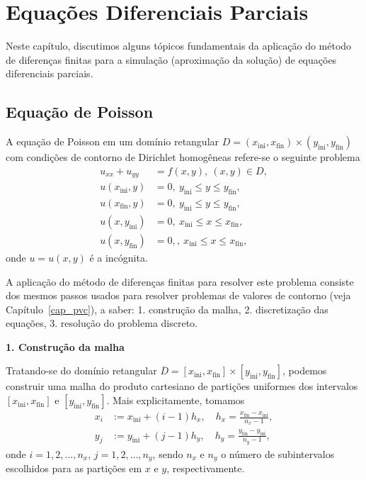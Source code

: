 

\chapter{Equações Diferenciais Parciais}\label{cap_edp}
\thispagestyle{fancy}

Neste capítulo, discutimos alguns tópicos fundamentais da aplicação do método de diferenças finitas para a simulação (aproximação da solução) de equações diferenciais parciais.

\section{Equação de Poisson}\label{cap_edp_sec_Poisson}

A equação de Poisson em um domínio retangular $D = (x_{\text{ini}}, x_{\text{fin}})\times (y_{\text{ini}}, y_{\text{fin}})$ com condições de contorno de Dirichlet homogêneas refere-se o seguinte problema
\begin{align}
  u_{xx} + u_{yy} &= f(x, y),~(x, y)\in D, \label{eq:edp_Poisson_eq}\\
  u(x_{\text{ini}}, y) &= 0,~y_{\text{ini}}\leq y \leq y_{\text{fin}},\label{eq:edp_Poisson_bcxini}\\
  u(x_{\text{fin}}, y) &= 0,~y_{\text{ini}}\leq y \leq y_{\text{fin}},\label{eq:edp_Poisson_bcxfin}\\
  u(x, y_{\text{ini}}) &= 0,~x_{\text{ini}}\leq x \leq x_{\text{fin}},\label{eq:edp_Poisson_bcyini}\\
  u(x, y_{\text{fin}}) &= 0,,~x_{\text{ini}}\leq x \leq x_{\text{fin}},\label{eq:edp_Poisson_bcyfin}
\end{align}
onde $u = u(x,y)$ é a incógnita.

A aplicação do método de diferenças finitas para resolver este problema consiste dos mesmos passos usados para resolver problemas de valores de contorno (veja Capítulo~\ref{cap_pvc}), a saber: 1. construção da malha, 2. discretização das equações, 3. resolução do problema discreto.

\begin{flushleft}
  {\bf 1. Construção da malha}
\end{flushleft}

Tratando-se do domínio retangular $\overline{D} = [x_{\text{ini}}, x_{\text{fin}}]\times [y_{\text{ini}}, y_{\text{fin}}]$, podemos construir uma malha do produto cartesiano de partições uniformes dos intervalos $[x_{\text{ini}}, x_{\text{fin}}]$ e $[y_{\text{ini}}, y_{\text{fin}}]$. Mais explicitamente, tomamos
\begin{align}
  x_{i} &:= x_{\text{ini}} + (i-1)h_x,\quad h_x = \frac{x_{\text{fin}}-x_{\text{ini}}}{n_x-1},\\
  y_{j} &:= y_{\text{ini}} + (j-1)h_y,\quad h_y = \frac{y_{\text{fin}}-y_{\text{ini}}}{n_y-1},  
\end{align}
onde $i = 1, 2, \dotsc, n_x$, $j = 1, 2, \dotsc, n_y$, sendo $n_x$ e $n_y$ o número de subintervalos escolhidos para as partições em $x$ e $y$, respectivamente.

